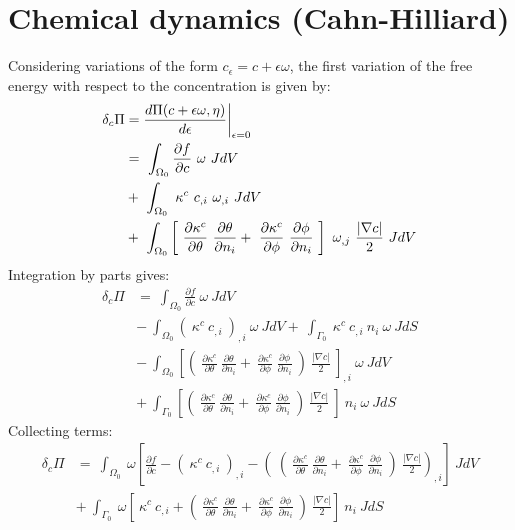 \section{Chemical dynamics (Cahn-Hilliard)}
Considering variations of the form $c_{\epsilon} = c + \epsilon \omega$, the first variation of the free energy with respect to the concentration is given by:
\begin{align}
\delta_{c}\Pi &= \frac{d \Pi(c + \epsilon \omega, \eta)}{d\epsilon} \bigg|_{\epsilon=0} \notag  \nonumber \\
  &= ~\int_{\Omega_0}  \frac{\partial f}{\partial c}~\omega ~J dV  \nonumber \\
  &+ ~\int_{\Omega_0}  ~\kappa^c~c_{,i}~\omega_{,i} ~J dV  \nonumber \\
  &+ ~\int_{\Omega_0}  \left[ ~\frac{\partial \kappa^c}{\partial \theta}  ~\frac{\partial \theta}{\partial n_i} +  ~\frac{\partial \kappa^c}{\partial \phi} ~\frac{\partial \phi}{\partial n_i} ~\right] ~\omega_{,j} ~\frac{|\nabla c|}{2} ~J dV 
\end{align}
Integration by parts gives:
\begin{align}
\delta_{c}\Pi &= ~\int_{\Omega_0}  \frac{\partial f}{\partial c}~\omega ~J dV  \nonumber \\
  &- ~\int_{\Omega_0}  \left(~\kappa^c~c_{,i}~\right)_{,i} ~\omega ~J dV + ~\int_{\Gamma_0} ~\kappa^c~c_{,i} ~n_{i} ~\omega ~J dS  \nonumber \\
  &- ~\int_{\Omega_0}  \left[ \left( ~\frac{\partial \kappa^c}{\partial \theta} ~\frac{\partial \theta}{\partial n_i} +  ~\frac{\partial \kappa^c}{\partial \phi} ~\frac{\partial \phi}{\partial n_i} ~\right) ~\frac{|\nabla c|}{2} ~\right]_{,i} ~\omega ~J dV  \nonumber \\
  &+ ~\int_{\Gamma_0}  \left[ \left( ~\frac{\partial \kappa^c}{\partial \theta} ~\frac{\partial \theta}{\partial n_i} +  ~\frac{\partial \kappa^c}{\partial \phi} ~\frac{\partial \phi}{\partial n_i} ~\right) ~\frac{|\nabla c|}{2} ~\right] ~n_{i} ~\omega ~J dS 
\end{align}
Collecting terms:
\begin{align}
\delta_{c}\Pi &= ~\int_{\Omega_0}  ~\omega \left[\frac{\partial f}{\partial c} - \left(~\kappa^c~c_{,i}~\right)_{,i} - \left( ~\left(~\frac{\partial \kappa^c}{\partial \theta} ~\frac{\partial \theta}{\partial n_i} +  ~\frac{\partial \kappa^c}{\partial \phi} ~\frac{\partial \phi}{\partial n_i} ~\right) ~\frac{|\nabla c|}{2} \right)_{,i}  \right] ~J dV  \nonumber \\
  &+ ~\int_{\Gamma_0} ~\omega \left[ ~\kappa^c~c_{,i}  + \left( ~\frac{\partial \kappa^c}{\partial \theta} ~\frac{\partial \theta}{\partial n_i} +  ~\frac{\partial \kappa^c}{\partial \phi} ~\frac{\partial \phi}{\partial n_i} ~\right) ~\frac{|\nabla c|}{2}  \right] ~n_{i} ~J dS
\end{align}
